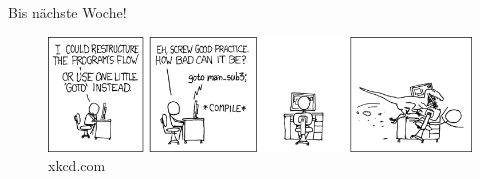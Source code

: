 \documentclass[18pt]{beamer}
\begin{document}
\begin{frame}{Bis nächste Woche!}
    \begin{figure}
        \includegraphics[scale=4]{img/goto.png}
        \caption{\footnotesize{xkcd.com}}
    \end{figure}
\end{frame}

\backupend
\end{document}
